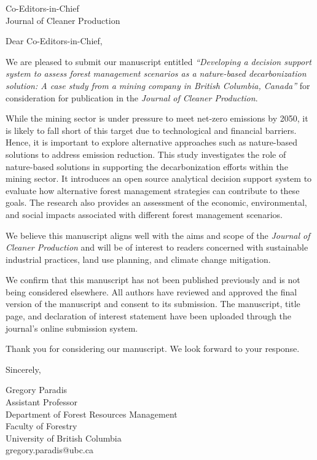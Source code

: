 \documentclass[12pt]{letter}
\date{June 24, 2025}
\begin{document}
\begin{letter}{Co-Editors-in-Chief\\Journal of Cleaner Production}

\opening{Dear Co-Editors-in-Chief,}

We are pleased to submit our manuscript entitled \textit{“Developing a decision support system to assess forest management scenarios as a nature-based decarbonization solution: A case study from a mining company in British Columbia, Canada”} for consideration for publication in the \textit{Journal of Cleaner Production}. 

While the mining sector is under pressure to meet net-zero emissions by 2050, it is likely to fall short of this target due to technological and financial barriers. Hence, it is important to explore alternative approaches such as nature-based solutions to address emission reduction. This study investigates the role of nature-based solutions in supporting the decarbonization efforts within the mining sector. It introduces an open source analytical decision support system to evaluate how alternative forest management strategies can contribute to these goals. The research also provides an assessment of the economic, environmental, and social impacts associated with different forest management scenarios.

We believe this manuscript aligns well with the aims and scope of the \textit{Journal of Cleaner Production} and will be of interest to readers concerned with sustainable industrial
practices, land use planning, and climate change mitigation.

We confirm that this manuscript has not been published previously and is not being considered elsewhere. All authors have reviewed and approved the final version of the manuscript and consent to its submission. The manuscript, title page, and declaration of interest statement have been uploaded through the journal’s online submission system.

Thank you for considering our manuscript. We look forward to your response.

Sincerely,

\vspace{1em}
\noindent
Gregory Paradis\\
Assistant Professor\\
Department of Forest Resources Management\\
Faculty of Forestry\\
University of British Columbia\\
gregory.paradis@ubc.ca

\end{letter}
\end{document}
